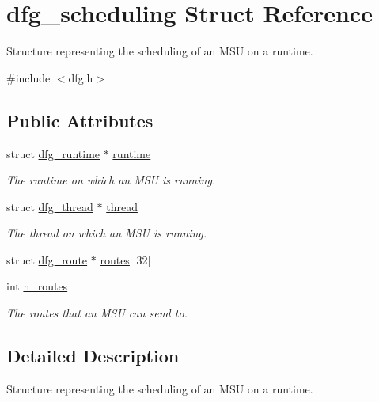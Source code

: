 \hypertarget{structdfg__scheduling}{\section{dfg\-\_\-scheduling Struct Reference}
\label{structdfg__scheduling}
}


Structure representing the scheduling of an M\-S\-U on a runtime.  




{\ttfamily \#include $<$dfg.\-h$>$}

\subsection*{Public Attributes}
\begin{DoxyCompactItemize}
\item 
struct \hyperlink{structdfg__runtime}{dfg\-\_\-runtime} $\ast$ \hyperlink{structdfg__scheduling_aadf67d30ca6ed713e50b99fc6ca7fff0}{runtime}
\begin{DoxyCompactList}\small\item\em The runtime on which an M\-S\-U is running. \end{DoxyCompactList}\item 
struct \hyperlink{structdfg__thread}{dfg\-\_\-thread} $\ast$ \hyperlink{structdfg__scheduling_af63999d85b15782bbfc667be6b227fa7}{thread}
\begin{DoxyCompactList}\small\item\em The thread on which an M\-S\-U is running. \end{DoxyCompactList}\item 
struct \hyperlink{structdfg__route}{dfg\-\_\-route} $\ast$ \hyperlink{structdfg__scheduling_abc82b642d4cdf20c3cb1d3de7b931fed}{routes} \mbox{[}32\mbox{]}
\item 
int \hyperlink{structdfg__scheduling_a9b5a55e6c50816ff72a84c246560d907}{n\-\_\-routes}
\begin{DoxyCompactList}\small\item\em The routes that an M\-S\-U can send to. \end{DoxyCompactList}\end{DoxyCompactItemize}


\subsection{Detailed Description}
Structure representing the scheduling of an M\-S\-U on a runtime. 

